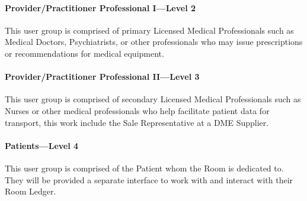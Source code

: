   \paragraph{Provider/Practitioner Professional I---Level 2}
  This user group is comprised of primary Licensed Medical Professionals such as Medical Doctors, Psychiatrists, or other professionals who may issue prescriptions or recommendations for medical equipment.

  \paragraph{Provider/Practitioner Professional II---Level 3}
  This user group is comprised of secondary Licensed Medical Professionals such as Nurses or other medical professionals who help facilitate patient data for transport, this work include the Sale Representative at a DME Supplier.

  \paragraph{Patients---Level 4}
  This user group is comprised of the Patient whom the Room is dedicated to. They will be provided a separate interface to work with and interact with their Room Ledger.




